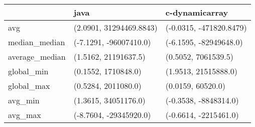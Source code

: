 \begin{tabular}{lll}
\toprule
{} &                     java &           c-dynamicarray \\
\midrule
avg            &  (2.0901, 31294469.8843) &  (-0.0315, -471820.8479) \\
median\_median  &   (-7.1291, -96007410.0) &   (-6.1595, -82949648.0) \\
average\_median &     (1.5162, 21191637.5) &      (0.5052, 7061539.5) \\
global\_min     &      (0.1552, 1710848.0) &     (1.9513, 21515888.0) \\
global\_max     &      (0.5284, 2011080.0) &        (0.0159, 60520.0) \\
avg\_min        &     (1.3615, 34051176.0) &    (-0.3538, -8848314.0) \\
avg\_max        &   (-8.7604, -29345920.0) &    (-0.6614, -2215461.0) \\
\bottomrule
\end{tabular}
